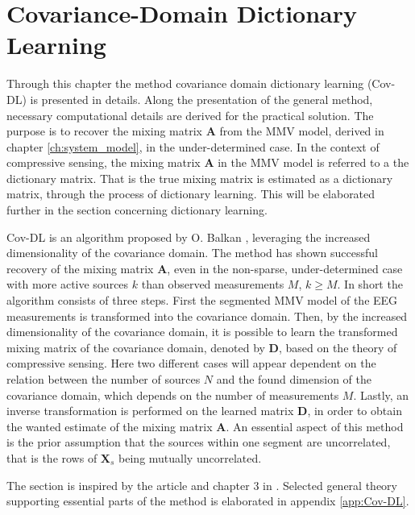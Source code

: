 \chapter{Covariance-Domain Dictionary Learning}\label{ch:Cov-DL}
Through this chapter the method covariance domain dictionary learning (Cov-DL) is presented in details. 
Along the presentation of the general method, necessary computational details are derived for the practical solution.
The purpose is to recover the mixing matrix $\mathbf{A}$ from the MMV model, derived in chapter \ref{ch:system_model}, in the under-determined case. 
In the context of compressive sensing, the mixing matrix $\mathbf{A}$ in the MMV model is referred to a the dictionary matrix. 
That is the true mixing matrix is estimated as a dictionary matrix, through the process of dictionary learning. 
This will be elaborated further in the section concerning dictionary learning.

Cov-DL is an algorithm proposed by O. Balkan \cite{Balkan2015}, leveraging the increased dimensionality of the covariance domain. 
The method has shown successful recovery of the mixing matrix $\mathbf{A}$, even in the non-sparse, under-determined case with more active sources $k$ than observed measurements $M$, $k \geq M$. 
In short the algorithm consists of three steps. 
First the segmented MMV model of the EEG measurements is transformed into the covariance domain. 
Then, by the increased dimensionality of the covariance domain, it is possible to learn the transformed mixing matrix of the covariance domain, denoted by $\mathbf{D}$, based on the theory of compressive sensing. 
Here two different cases will appear dependent on the relation between the number of sources $N$ and the found dimension of the covariance domain, which depends on the number of measurements $M$. 
Lastly, an inverse transformation is performed on the learned matrix $\mathbf{D}$, in order to obtain the wanted estimate of the mixing matrix $\mathbf{A}$. 
An essential aspect of this method is the prior assumption that the sources within one segment are uncorrelated, that is the rows of $\mathbf{X}_s$ being mutually uncorrelated. 

The section is inspired by the article \cite{Balkan2015} and chapter 3 in \cite{phd2015}. 
Selected general theory supporting essential parts of the method is elaborated in appendix \ref{app:Cov-DL}.


%